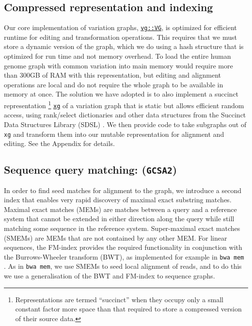 \documentclass[12pt]{article}
\newcommand{\gcsa}{{\tt GCSA2}}
\begin{document}
\subsection{Compressed representation and indexing}

Our core implementation of variation graphs, \href{https://github.com/vgteam/vg/blob/fbcb6e62/src/vg.hpp#L196-L1146}{{\tt vg::VG}}, is optimized for efficient runtime for editing and transformation operations.
This requires that we must store a dynamic version of the graph, which we do using a hash structure that is optimized for run time and not memory overhead.
To load the entire human genome graph with common variation into main memory would require more than 300GB of RAM with this representation, but editing and alignment operations are local and do not require the whole graph to be available in memory at once.
The solution we have adopted is to also implement a succinct representation \footnote{Representations are termed ``succinct'' when they occupy only a small constant factor more space than that required to store a compressed version of their source data.}  \href{https://github.com/vgteam/xg}{{\tt xg}} of a variation graph that is static but allows efficient random access, using rank/select dictionaries and other data structures from the Succinct Data Structures Library (SDSL) \cite{sdsl2014}. 
We then provide code to take subgraphs out of {\tt xg} and transform them into our mutable representation for alignment and editing.  See the Appendix for details.

\subsection{Sequence query matching: (\gcsa)}
\label{sec:GCSA2}

In order to find seed matches for alignment to the graph, we introduce a second index that enables very rapid discovery of maximal exact substring matches.  
Maximal exact matches (MEMs) are matches between a query and a reference system that cannot be extended in either direction along the query while still matching some sequence in the reference system.
Super-maximal exact matches (SMEMs) are MEMs that are not contained by any other MEM.
For linear sequences, the FM-index \cite{fmindex2000, fmindex2005} provides the required functionality in conjunction with the Burrows-Wheeler transform (BWT)\cite{burrowswheeler1994}, as implemented for example in {\tt bwa mem} \cite{li2013bwamem}.
As in {\tt bwa mem}, we use SMEMs to seed local alignment of reads, and to do this we use a generalisation of the BWT and FM-index to sequence graphs.
\end{document}
